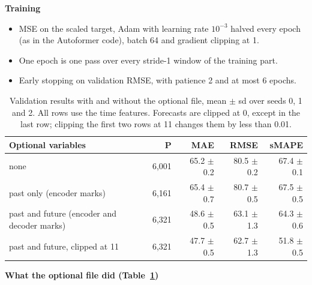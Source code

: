 \documentclass[10pt]{article}
\begin{document}
\textbf{Training}
\begin{itemize}
\item MSE on the scaled target, Adam with learning rate $10^{-3}$ halved every epoch (as in the Autoformer code), batch 64 and gradient clipping at 1.
\item One epoch is one pass over every stride-1 window of the training part.
\item Early stopping on validation RMSE, with patience 2 and at most 6 epochs.
\end{itemize}

\begin{table}[H]\centering\small
\begin{tabular}{lrrrr}
\toprule
Optional variables & P & MAE & RMSE & sMAPE \\
\midrule
none & 6,001 & 65.2 $\pm$ 0.2 & 80.5 $\pm$ 0.2 & 67.4 $\pm$ 0.1 \\
past only (encoder marks) & 6,161 & 65.4 $\pm$ 0.7 & 80.7 $\pm$ 0.5 & 67.5 $\pm$ 0.5 \\
past and future (encoder and decoder marks) & 6,321 & 48.6 $\pm$ 0.5 & 63.1 $\pm$ 1.3 & 64.3 $\pm$ 0.6 \\
past and future, clipped at 11 & 6,321 & 47.7 $\pm$ 0.5 & 62.7 $\pm$ 1.3 & 51.8 $\pm$ 0.5 \\
\bottomrule
\end{tabular}
\caption{Validation results with and without the optional file, mean $\pm$ sd over seeds 0, 1 and 2. All rows use the time features. Forecasts are clipped at 0, except in the last row; clipping the first two rows at 11 changes them by less than 0.01.}\label{tab:abl}
\end{table}
\textbf{What the optional file did (Table~\ref{tab:abl})}
\end{document}
